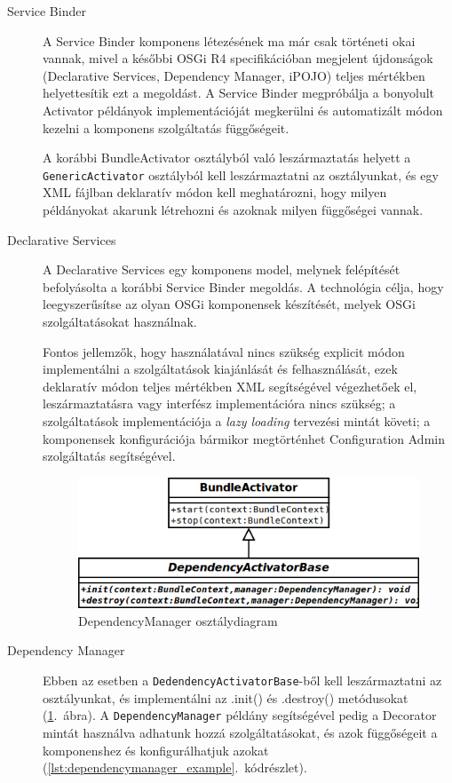 \begin{description}
	\item[Service Binder] A Service Binder komponens létezésének ma már csak történeti okai vannak, mivel a későbbi OSGi R4 specifikációban megjelent újdonságok (Declarative Services, Dependency Manager, iPOJO) teljes mértékben helyettesítik ezt a megoldást. A Service Binder megpróbálja a bonyolult Activator példányok implementációját megkerülni és automatizált módon kezelni a komponens szolgáltatás függőségeit.
	
	A korábbi BundleActivator osztályból való leszármaztatás helyett a \texttt{GenericActivator} osztályból kell leszármaztatni az osztályunkat, és egy XML fájlban deklaratív módon kell meghatározni, hogy milyen példányokat akarunk létrehozni és azoknak milyen függőségei vannak.
	
	\item[Declarative Services] A Declarative Services egy komponens model, melynek felépítését befolyásolta a korábbi Service Binder megoldás. A technológia célja, hogy leegyszerűsítse az olyan OSGi komponensek készítését, melyek OSGi szolgáltatásokat használnak.
	
	Fontos jellemzők, hogy használatával nincs szükség explicit módon implementálni a szolgáltatások kiajánlását és felhasználását, ezek deklaratív módon teljes mértékben XML segítségével végezhetőek el, leszármaztatásra vagy interfész implementációra nincs szükség; a szolgáltatások implementációja a \textit{lazy loading} tervezési mintát követi; a komponensek konfigurációja bármikor megtörténhet Configuration Admin szolgáltatás segítségével.
	
\begin{figure}[htp]
\centering
\includegraphics[scale=0.5]{img/dependencymanager}
\caption{DependencyManager osztálydiagram}
\label{fig:dependencymanager}
\end{figure}
	
	\item[Dependency Manager] Ebben az esetben a \texttt{DedendencyActivatorBase}-ből kell leszármaztatni az osztályunkat, és implementálni az .init() és .destroy() metódusokat (\ref{fig:dependencymanager}.~ábra). A \texttt{DependencyManager} példány segítségével pedig a Decorator mintát használva adhatunk hozzá szolgáltatásokat, és azok függőségeit a komponenshez és konfigurálhatjuk azokat (\ref{lst:dependencymanager_example}.~kódrészlet).


\end{description}
